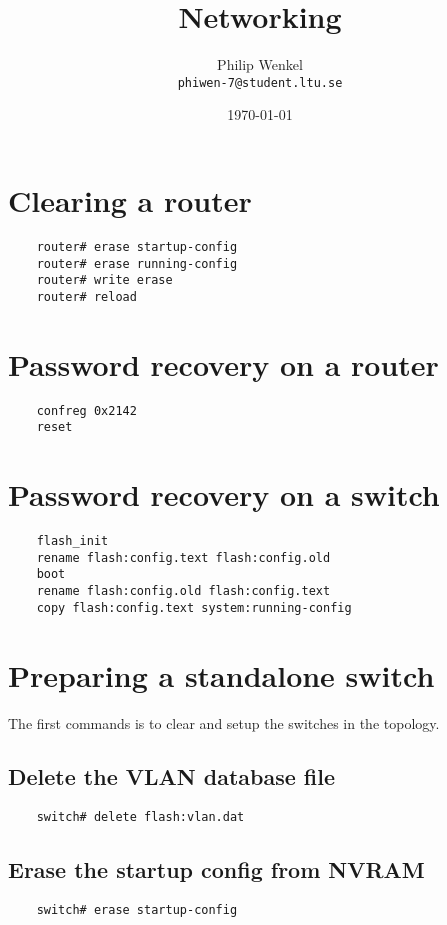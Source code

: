 \documentclass{article}
\title {
	Networking
}
\author {
	Philip Wenkel \\
	{\tt phiwen-7@student.ltu.se}
}
\date{\today}
\begin{document}
\maketitle

\newpage
\tableofcontents

\newpage

\section{Clearing a router}

\begin{verbatim}
	router# erase startup-config
	router# erase running-config
	router# write erase
	router# reload
\end{verbatim}

\section{Password recovery on a router}

\begin{verbatim}
	confreg 0x2142
	reset
\end{verbatim}

\section{Password recovery on a switch}

\begin{verbatim}
	flash_init
	rename flash:config.text flash:config.old
	boot
	rename flash:config.old flash:config.text
	copy flash:config.text system:running-config
\end{verbatim}

\section{Preparing a standalone switch}
The first commands is to clear and setup the switches in the topology.


\subsection{Delete the VLAN database file}
\begin{verbatim}
	switch# delete flash:vlan.dat
\end{verbatim}

\subsection{Erase the startup config from NVRAM}
\begin{verbatim}
	switch# erase startup-config
\end{verbatim}
\end{document}
